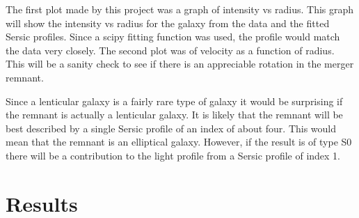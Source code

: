 \documentclass[fleqn,usenatbib]{mnras}
\begin{document}
 The first plot made by this project was a graph of intensity vs radius. This graph will show the intensity vs radius for the galaxy from the data and the fitted Sersic profiles. Since a scipy fitting function was used, the profile would match the data very closely. The second plot was of velocity as a function of radius. This will be a sanity check to see if there is an appreciable rotation in the merger remnant.

 Since a lenticular galaxy is a fairly rare type of galaxy it would be surprising if the remnant is actually a lenticular galaxy. It is likely that the remnant will be best described by a single Sersic profile of an index of about four. This would mean that the remnant is an elliptical galaxy. However, if the result is of type S0 there will be a contribution to the light profile from a Sersic profile of index 1. 

 \section{Results}
\end{document}
